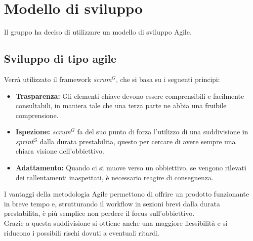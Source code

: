 \section{Modello di sviluppo}
Il gruppo ha deciso di utilizzare un modello di sviluppo Agile.

\subsection {Sviluppo di tipo agile}
Verrà utilizzato il framework \textit{scrum}$^{G}$, che si basa su i seguenti principi:
\begin{itemize}
    \item \textbf{Trasparenza:} Gli elementi chiave devono essere comprensibili e facilmente consultabili, in maniera tale che una terza parte ne abbia una fruibile comprensione.
    
    \item \textbf{Ispezione:} \textit{scrum}$^{G}$ fa del suo punto di forza l'utilizzo di una suddivisione in \textit{sprint}$^{G}$ dalla durata prestabilita, questo per cercare di avere sempre una chiara visione dell'obbiettivo.
    
    \item \textbf{Adattamento:} Quando ci si muove verso un obbiettivo, se vengono rilevati dei rallentamenti inaspettati, è necessario reagire di conseguenza.
\end{itemize}
I vantaggi della metodologia Agile permettono di offrire un prodotto funzionante in breve tempo e, strutturando il workflow in sezioni brevi dalla durata prestabilita, è più semplice non perdere il focus sull'obbiettivo. \\
Grazie a questa suddivisione si ottiene anche una maggiore flessibilità e si riducono i possibili rischi dovuti a eventuali ritardi.